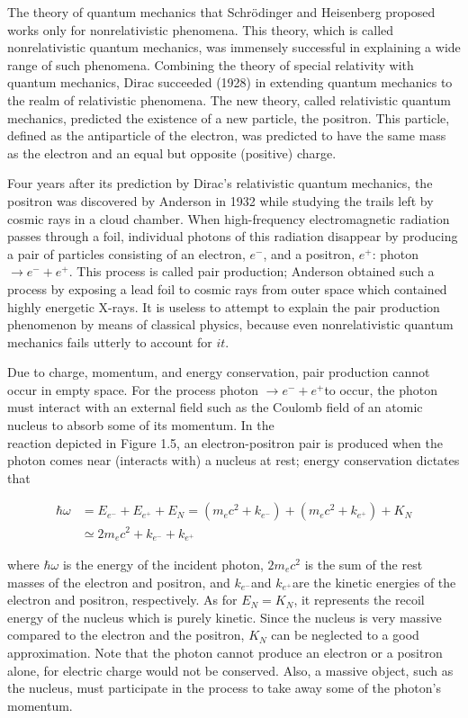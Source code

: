 \documentclass[10pt]{article}
\begin{document}
The theory of quantum mechanics that Schrödinger and Heisenberg proposed works only for nonrelativistic phenomena. This theory, which is called nonrelativistic quantum mechanics, was immensely successful in explaining a wide range of such phenomena. Combining the theory of special relativity with quantum mechanics, Dirac succeeded (1928) in extending quantum mechanics to the realm of relativistic phenomena. The new theory, called relativistic quantum mechanics, predicted the existence of a new particle, the positron. This particle, defined as the antiparticle of the electron, was predicted to have the same mass as the electron and an equal but opposite (positive) charge.

Four years after its prediction by Dirac's relativistic quantum mechanics, the positron was discovered by Anderson in 1932 while studying the trails left by cosmic rays in a cloud chamber. When high-frequency electromagnetic radiation passes through a foil, individual photons of this radiation disappear by producing a pair of particles consisting of an electron, $e^{-}$, and a positron, $e^{+}$: photon $\rightarrow e^{-}+e^{+}$. This process is called pair production; Anderson obtained such a process by exposing a lead foil to cosmic rays from outer space which contained highly energetic X-rays. It is useless to attempt to explain the pair production phenomenon by means of classical physics, because even nonrelativistic quantum mechanics fails utterly to account for $i t$.

Due to charge, momentum, and energy conservation, pair production cannot occur in empty space. For the process photon $\rightarrow e^{-}+e^{+}$to occur, the photon must interact with an external field such as the Coulomb field of an atomic nucleus to absorb some of its momentum. In the\\
reaction depicted in Figure 1.5, an electron-positron pair is produced when the photon comes near (interacts with) a nucleus at rest; energy conservation dictates that


\begin{align*}
\hbar \omega & =E_{e^{-}}+E_{e^{+}}+E_{N}=\left(m_{e} c^{2}+k_{e^{-}}\right)+\left(m_{e} c^{2}+k_{e^{+}}\right)+K_{N} \\
& \simeq 2 m_{e} c^{2}+k_{e^{-}}+k_{e^{+}} \tag{1.41}
\end{align*}


where $\hbar \omega$ is the energy of the incident photon, $2 m_{e} c^{2}$ is the sum of the rest masses of the electron and positron, and $k_{e^{-}}$and $k_{e^{+}}$are the kinetic energies of the electron and positron, respectively. As for $E_{N}=K_{N}$, it represents the recoil energy of the nucleus which is purely kinetic. Since the nucleus is very massive compared to the electron and the positron, $K_{N}$ can be neglected to a good approximation. Note that the photon cannot produce an electron or a positron alone, for electric charge would not be conserved. Also, a massive object, such as the nucleus, must participate in the process to take away some of the photon's momentum.
\end{document}
